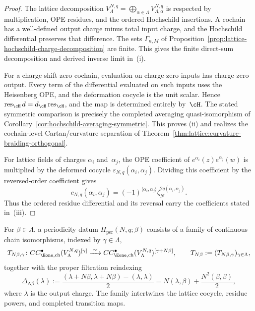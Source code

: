 \begin{proof}
The lattice decomposition
$V_\Lambda^{N,q}=\bigoplus_{\alpha\in\Lambda}
V_{\Lambda,\alpha}^{N,q}$ is respected by multiplication, OPE
residues, and the ordered Hochschild insertions. A cochain has a
well-defined output charge minus total input charge, and the
Hochschild differential preserves that difference.  The sets
$\Gamma_{n,M}$ of
Proposition~\ref{prop:lattice-hochschild-charge-decomposition} are
finite.  This gives the finite direct-sum decomposition and derived
inverse limit in~\textup{(i)}.

For a charge-shift-zero cochain, evaluation on charge-zero inputs has
charge-zero output.  Every term of the differential evaluated on such
inputs uses the Heisenberg OPE, and the deformation cocycle is the unit
scalar.  Hence
$\operatorname{res}_{\cH}d=d_{\cH}\operatorname{res}_{\cH}$, and the
map is determined entirely by~$\cH$.  The stated symmetric comparison is
precisely the completed averaging quasi-isomorphism of
Corollary~\ref{cor:hochschild-averaging-symmetric}.  This proves
\textup{(ii)} and realizes the cochain-level Cartan/curvature separation
of Theorem~\ref{thm:lattice:curvature-braiding-orthogonal}.

For lattice fields of charges $\alpha_i$ and~$\alpha_j$, the OPE
coefficient of
$e^{\alpha_i}(z)e^{\alpha_j}(w)$ is multiplied by the deformed
cocycle $\varepsilon_{N,q}(\alpha_i,\alpha_j)$.  Dividing this
coefficient by the reversed-order coefficient gives
\[
c_{N,q}(\alpha_i,\alpha_j)
=(-1)^{\langle\alpha_i,\alpha_j\rangle}
\zeta_N^{2q(\alpha_i,\alpha_j)} .
\]
Thus the ordered residue differential and its reversal carry the
coefficients stated in~\textup{(iii)}.
\end{proof}

\begin{definition}
\label{def:lattice:e1-hochschild-periodicity}
For $\beta\in\Lambda$, a periodicity datum
$H_{\mathrm{per}}(N,q;\beta)$ consists of a family of continuous chain
isomorphisms, indexed by $\gamma\in\Lambda$,
\[
 T_{N\beta,\gamma}\colon
 CC^\bullet_{\Eone,\mathrm{ch}}(V_\Lambda^{N,q})^{[\gamma]}
 \xrightarrow{\;\sim\;}
 CC^\bullet_{\Eone,\mathrm{ch}}(V_\Lambda^{N,q})^{[\gamma+N\beta]},
 \qquad
 T_{N\beta}:=(T_{N\beta,\gamma})_{\gamma\in\Lambda},
\]
together with the proper filtration reindexing
\[
 \Delta_{N\beta}(\lambda)
 :=\frac{(\lambda+N\beta,\lambda+N\beta)-(\lambda,\lambda)}2
 =N(\lambda,\beta)+\frac{N^2(\beta,\beta)}2,
\]
where $\lambda$ is the output charge.  The family intertwines the
lattice cocycle, residue powers, and completed transition maps.
\end{definition}

